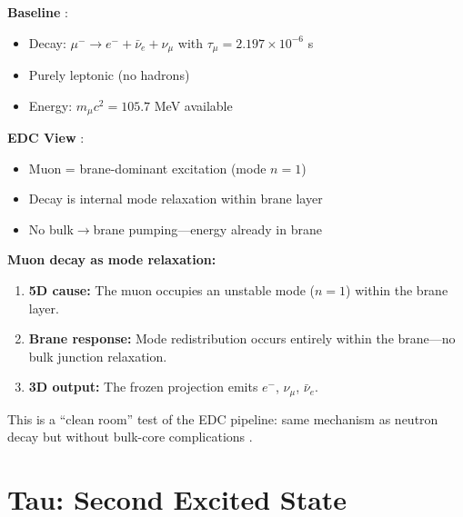 \begin{tcolorbox}[colback=blue!5!white, colframe=blue!50!black,
    title=\textbf{Muon at a Glance}]
\textbf{Baseline} \tagBL{}:
\begin{itemize}[nosep]
    \item Decay: $\mu^- \to e^- + \bar\nu_e + \nu_\mu$ with $\tau_\mu = 2.197 \times 10^{-6}$ s
    \item Purely leptonic (no hadrons)
    \item Energy: $m_\mu c^2 = 105.7$ MeV available
\end{itemize}

\textbf{EDC View} \tagP{}:
\begin{itemize}[nosep]
    \item Muon = brane-dominant excitation (mode $n = 1$)
    \item Decay is internal mode relaxation within brane layer
    \item No bulk$\to$brane pumping---energy already in brane
\end{itemize}
\end{tcolorbox}

\textbf{Muon decay as mode relaxation:}

\begin{enumerate}[nosep]
    \item \textbf{5D cause:} The muon occupies an unstable mode ($n=1$) within the brane layer.
    \item \textbf{Brane response:} Mode redistribution occurs entirely within the brane---no bulk junction relaxation.
    \item \textbf{3D output:} The frozen projection emits $e^-$, $\nu_\mu$, $\bar{\nu}_e$.
\end{enumerate}

This is a ``clean room'' test of the EDC pipeline: same mechanism as neutron decay
but without bulk-core complications \tagDc{}.

\section{Tau: Second Excited State}
\label{sec:tau}


